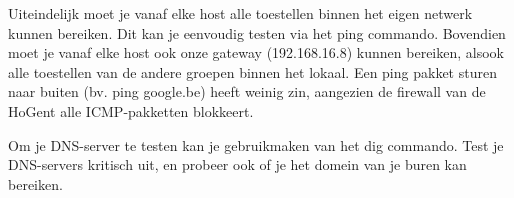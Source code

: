 \documentclass{report}
\begin{document}
	Uiteindelijk moet je vanaf elke host alle toestellen binnen het eigen netwerk kunnen bereiken. Dit kan je eenvoudig testen via het ping commando. Bovendien moet je vanaf elke host ook onze gateway (192.168.16.8) kunnen bereiken, alsook alle toestellen van de andere groepen binnen het lokaal. Een ping pakket sturen naar buiten (bv. ping google.be) heeft weinig zin, aangezien de firewall van de HoGent alle ICMP-pakketten blokkeert.
	
	Om je DNS-server te testen kan je gebruikmaken van het dig commando. Test je DNS-servers kritisch uit, en probeer ook of je het domein van je buren kan bereiken. 
\end{document}
